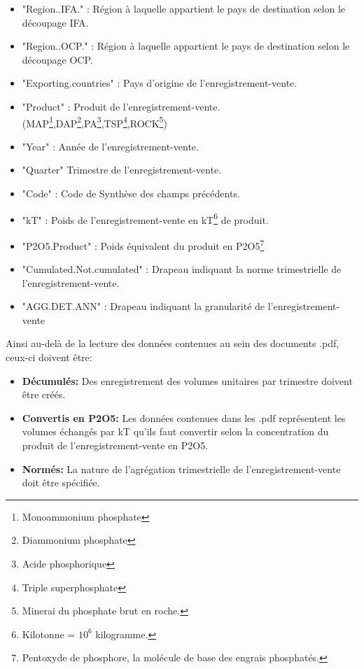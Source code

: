 \begin{enumerate}
\begin{itemize}
	\item "Region..IFA." : Région à laquelle appartient le pays de destination selon le découpage IFA.
	\item "Region..OCP." : Région à laquelle appartient le pays de destination selon le découpage OCP.
	\item "Exporting.countries" : Pays d'origine de l'enregistrement-vente.
	\item "Product" : Produit de l'enregistrement-vente. (MAP\footnote{Monoammonium phosphate},DAP\footnote{Diammonium phosphate},PA\footnote{Acide phosphorique},TSP\footnote{Triple superphosphate},ROCK\footnote{Minerai du phosphate brut en roche.})
	\item "Year" : Année de l'enregistrement-vente.
	\item "Quarter" Trimestre de l'enregistrement-vente.
	\item "Code" : Code de Synthèse des champs précédents.
	\item "kT" :  Poids de l'enregistrement-vente en kT\footnote{Kilotonne = $10^6$ kilogramme.} de produit.           
	\item "P2O5.Product" : Poids équivalent du produit en P2O5\footnote{Pentoxyde de phosphore, la molécule de base des engrais phosphatés.}
	\item "Cumulated.Not.cumulated" : Drapeau indiquant la norme trimestrielle de l'enregistrement-vente.
	\item "AGG.DET.ANN" : Drapeau indiquant la granularité de l'enregistrement-vente
	\end{itemize}
		Ainsi au-delà de la lecture des données contenues au sein des documents .pdf, ceux-ci doivent être:
		\begin{itemize}
		\item \textbf{Décumulés:} Des enregistrement des volumes unitaires par trimestre doivent être créés.
		\item \textbf{Convertis en P2O5:} Les données contenues dans les .pdf représentent les volumes échangés par kT qu'ils faut convertir selon la concentration du produit de l'enregistrement-vente en P2O5.
		\item \textbf{Normés:} La nature de l'agrégation trimestrielle de l'enregistrement-vente doit être spécifiée.
		\end{itemize}
	\end{enumerate}
